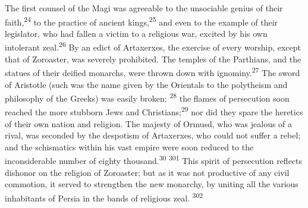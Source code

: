 The first counsel of the Magi was agreeable to the unsociable
genius of their faith,\textsuperscript{24} to the practice of ancient kings,\textsuperscript{25}
and even to the example of their legislator, who had fallen a
victim to a religious war, excited by his own intolerant zeal.\textsuperscript{26}
By an edict of Artaxerxes, the exercise of every worship, except
that of Zoroaster, was severely prohibited. The temples of the
Parthians, and the statues of their deified monarchs, were thrown
down with ignominy.\textsuperscript{27} The sword of Aristotle (such was the name
given by the Orientals to the polytheism and philosophy of the
Greeks) was easily broken; \textsuperscript{28} the flames of persecution soon
reached the more stubborn Jews and Christians;\textsuperscript{29} nor did they
spare the heretics of their own nation and religion. The majesty
of Ormusd, who was jealous of a rival, was seconded by the
despotism of Artaxerxes, who could not suffer a rebel; and the
schismatics within his vast empire were soon reduced to the
inconsiderable number of eighty thousand.\textsuperscript{30} \textsuperscript{301} This spirit of
persecution reflects dishonor on the religion of Zoroaster; but
as it was not productive of any civil commotion, it served to
strengthen the new monarchy, by uniting all the various
inhabitants of Persia in the bands of religious zeal. \textsuperscript{302}







